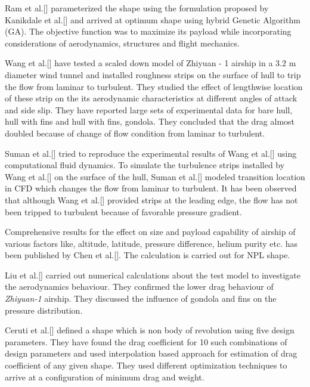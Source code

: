Ram et al.[] parameterized the shape using the formulation proposed by Kanikdale et al.[] and arrived at optimum shape using hybrid Genetic Algorithm (GA). The objective function was to maximize its payload while incorporating considerations of aerodynamics, structures and flight mechanics.

Wang et al.[] have tested a scaled down model of Zhiyuan - 1 airship in a 3.2 m diameter wind tunnel and installed roughness strips on the surface of hull to trip the flow from laminar to turbulent. They studied the effect of lengthwise location of these strip on the its aerodynamic characteristics at different angles of attack and side slip. They have reported large sets of experimental data for bare hull, hull with fins and hull with fins, gondola. They concluded  that the drag almost doubled because of change of flow condition from laminar to turbulent.

Suman et al.[] tried to reproduce the experimental results of Wang et al.[] using computational fluid dynamics. To simulate the turbulence strips installed by  Wang et al.[] on the surface of the hull, Suman et al.[] modeled transition location in CFD which changes the flow from laminar to turbulent. It has been observed that although Wang et al.[] provided strips at the leading edge, the flow has not been tripped to turbulent because of favorable pressure gradient.

Comprehensive results for the effect on size and payload capability of airship of various factors like, altitude, latitude, pressure difference, helium purity etc. has been published by Chen et al.[]. The calculation is carried out for NPL shape.


Liu et al.[] carried out numerical calculations about the test model to investigate the aerodynamics behaviour. They confirmed the lower drag behaviour of \textit{Zhiyuan-1} airship. They discussed the influence of gondola and fins on the pressure distribution.

Ceruti et al.[] defined a shape which is non body of revolution using five design parameters. They have found the drag coefficient for 10 such combinations of design parameters and used interpolation based approach for estimation of drag coefficient of any given shape. They used different optimization techniques to arrive at a configuration of minimum drag and weight. 



